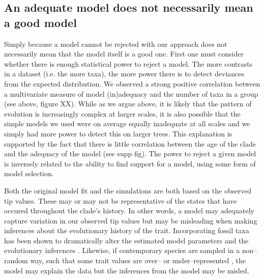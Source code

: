 \documentclass[a4paper,12pt]{article}
\begin{document}
\subsection*{An adequate model does not necessarily mean a good model}
Simply because a model cannot be rejected with our approach does not necessarily mean that the model itself is a good one. First one must consider whether there is enough statistical power to reject a model. The more contrasts in a dataset (i.e. the more taxa), the more power there is to detect deviances from the expected distribution. We observed a strong positive correlation between a multivariate measure of model (in)adequacy and the number of taxa in a group (see above, figure XX). While as we argue above, it is likely that the pattern of evolution is increasingly complex at larger scales, it is also possible that the simple models we used were on average equally inadequate at all scales and we simply had more power to detect this on larger trees. This explanation is supported by the fact that there is little correlation between the age of the clade and the adequacy of the model (see supp fig). The power to reject a given model is inversely related to the ability to find support for a model, using some form of model selection.

Both the original model fit and the simulations are both based on the observed tip values. These may or may not be representative of the states that have occured throughout the clade's history. In other words, a model may adequately capture variation in our observed tip values but may be misleading when making inferences about the evolutionary history of the trait. Incorporating fossil taxa has been shown to dramatically alter the estimated model parameters and the evolutionary inferences \citep{FF2006, Slater2012Fossil, SlaterMEE}. Likewise, if contemporary species are sampled in a non--random way, such that some trait values are over-- or under--represented \citep{Freckletoninaction, FitzJohnwoody}, the model may explain the data but the inferences from the model may be misled. 
\end{document}

